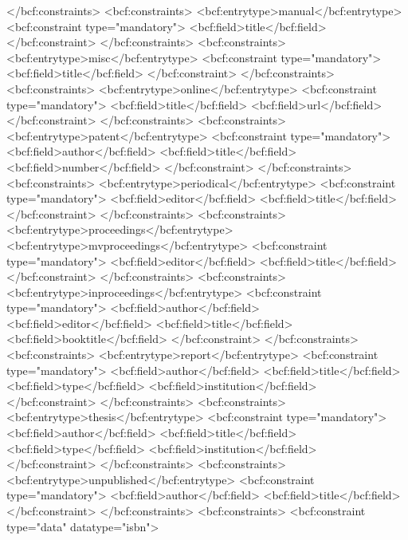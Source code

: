     </bcf:constraints>
    <bcf:constraints>
      <bcf:entrytype>manual</bcf:entrytype>
      <bcf:constraint type="mandatory">
        <bcf:field>title</bcf:field>
      </bcf:constraint>
    </bcf:constraints>
    <bcf:constraints>
      <bcf:entrytype>misc</bcf:entrytype>
      <bcf:constraint type="mandatory">
        <bcf:field>title</bcf:field>
      </bcf:constraint>
    </bcf:constraints>
    <bcf:constraints>
      <bcf:entrytype>online</bcf:entrytype>
      <bcf:constraint type="mandatory">
        <bcf:field>title</bcf:field>
        <bcf:field>url</bcf:field>
      </bcf:constraint>
    </bcf:constraints>
    <bcf:constraints>
      <bcf:entrytype>patent</bcf:entrytype>
      <bcf:constraint type="mandatory">
        <bcf:field>author</bcf:field>
        <bcf:field>title</bcf:field>
        <bcf:field>number</bcf:field>
      </bcf:constraint>
    </bcf:constraints>
    <bcf:constraints>
      <bcf:entrytype>periodical</bcf:entrytype>
      <bcf:constraint type="mandatory">
        <bcf:field>editor</bcf:field>
        <bcf:field>title</bcf:field>
      </bcf:constraint>
    </bcf:constraints>
    <bcf:constraints>
      <bcf:entrytype>proceedings</bcf:entrytype>
      <bcf:entrytype>mvproceedings</bcf:entrytype>
      <bcf:constraint type="mandatory">
        <bcf:field>editor</bcf:field>
        <bcf:field>title</bcf:field>
      </bcf:constraint>
    </bcf:constraints>
    <bcf:constraints>
      <bcf:entrytype>inproceedings</bcf:entrytype>
      <bcf:constraint type="mandatory">
        <bcf:field>author</bcf:field>
        <bcf:field>editor</bcf:field>
        <bcf:field>title</bcf:field>
        <bcf:field>booktitle</bcf:field>
      </bcf:constraint>
    </bcf:constraints>
    <bcf:constraints>
      <bcf:entrytype>report</bcf:entrytype>
      <bcf:constraint type="mandatory">
        <bcf:field>author</bcf:field>
        <bcf:field>title</bcf:field>
        <bcf:field>type</bcf:field>
        <bcf:field>institution</bcf:field>
      </bcf:constraint>
    </bcf:constraints>
    <bcf:constraints>
      <bcf:entrytype>thesis</bcf:entrytype>
      <bcf:constraint type="mandatory">
        <bcf:field>author</bcf:field>
        <bcf:field>title</bcf:field>
        <bcf:field>type</bcf:field>
        <bcf:field>institution</bcf:field>
      </bcf:constraint>
    </bcf:constraints>
    <bcf:constraints>
      <bcf:entrytype>unpublished</bcf:entrytype>
      <bcf:constraint type="mandatory">
        <bcf:field>author</bcf:field>
        <bcf:field>title</bcf:field>
      </bcf:constraint>
    </bcf:constraints>
    <bcf:constraints>
      <bcf:constraint type="data" datatype="isbn">
